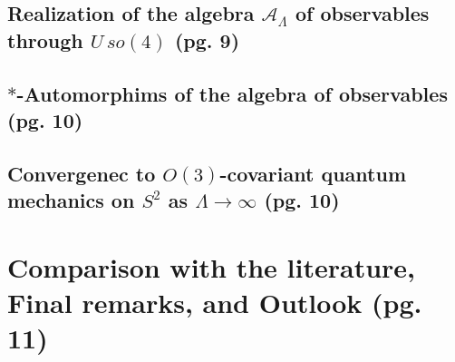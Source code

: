 \documentclass{article}
\begin{document}
\subsection{Realization of the algebra $\mathcal A_\Lambda$ of observables through $U\,so(4)$ (pg. 9)}

\subsection{$*$-Automorphims of the algebra of observables (pg. 10)}


\subsection{Convergenec to $O(3)$-covariant quantum mechanics on $S^2$ as $\Lambda \to \infty$ (pg. 10)}


\section{Comparison with the literature, Final remarks, and Outlook (pg. 11)}
\end{document}
